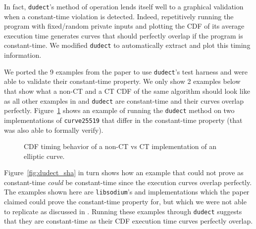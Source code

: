 In fact, \texttt{dudect}'s method of operation lends itself well to a graphical validation when a constant-time violation is detected.
Indeed, repetitively running the program with fixed/random private inputs and plotting the CDF of its average execution time generates curves that should perfectly overlap if the program is constant-time.
We modified \texttt{dudect} to automatically extract and plot this timing information.

We ported the 9 examples from the \ctVerif paper to use \texttt{dudect}'s test harness and were able to validate their constant-time property.
We only show 2 examples below that show what a non-CT and a CT CDF of the same algorithm should look like as all other examples in \ctVerif and \texttt{dudect} are constant-time and their curves overlap perfectly.
Figure~\ref{fig:dudect_donna} shows an example of running the \texttt{dudect} method on two implementations of \texttt{curve25519} that differ in the constant-time property (that \ctVerif was also able to formally verify).

\begin{figure}[h!]
  \centering
  \label{fig:dudect_donnabad}
  \label{fig:dudect_donnagood}
  \caption{CDF timing behavior of a non-CT vs CT implementation of an elliptic curve.}
  \label{fig:dudect_donna}
\end{figure}

Figure~\ref{fig:dudect_sha} in turn shows how an example that \ctVerif could not prove as constant-time \emph{could} be constant-time since the execution curves overlap perfectly.
The examples shown here are \texttt{libsodium}'s  and  implementations which the \ctVerif paper claimed could prove the constant-time property for, but which we were not able to replicate as discussed in .
Running these examples through \texttt{dudect} suggests that they are constant-time as their CDF execution time
curves perfectly overlap.

